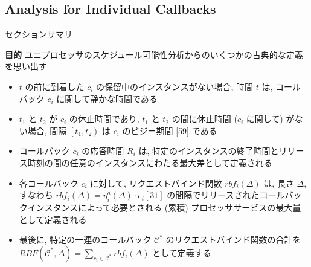 \subsection{Analysis for Individual Callbacks}
\label{ssec: analysis for individual callbacks}

\begin{frame}{セクションサマリ}
    \begin{itembox}[l]{\textbf{目的}}
        ユニプロセッサのスケジュール可能性分析からのいくつかの古典的な定義を思い出す
    \end{itembox}
\end{frame}

\begin{frame}{}
    \begin{itemize}
        \item $t$ の前に到着した $c_{i}$ の保留中のインスタンスがない場合, 時間 $t$ は, コールバック $c_{i}$ に関して静かな時間である
        \item $t_{1}$ と $t_{2}$ が $c_{i}$ の休止時間であり, $t_{1}$ と $t_{2}$ の間に休止時間 ($c_{i}$ に関して) がない場合, 間隔 $\left[t_{1}, t_{2}\right)$ は $c_{i}$ のビジー期間 [59] である
        \item コールバック $c_{i}$ の応答時間 $R_{i}$ は, 特定のインスタンスの終了時間とリリース時刻の間の任意のインスタンスにわたる最大差として定義される
        \item 各コールバック $c_{i}$ に対して, リクエストバインド関数 $r b f_{i}(\Delta)$ は, 長さ $\Delta$, すなわち $r b f_{i}(\Delta)=\eta_{i}^{a}(\Delta) \cdot e_{i}[31]$ の間隔でリリースされたコールバックインスタンスによって必要とされる (累積) プロセッササービスの最大量として定義される
        \item 最後に, 特定の一連のコールバック $\mathcal{C}^{*}$ のリクエストバインド関数の合計を $R B F\left(\mathcal{C}^{*}, \Delta\right)=\sum_{c_{i} \in \mathcal{C}^{*}} r b f_{i}(\Delta)$ として定義する
    \end{itemize}
\end{frame}

